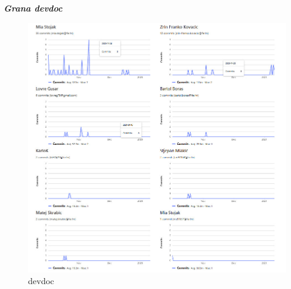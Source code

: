 		\begin{packed_item}
			\item \textbf{\textit{Grana devdoc}}\\
			
			\begin{figure}[h!]
				\centering
				\includegraphics[width=\linewidth]{./slike/devdoc.jpeg}
				\caption{devdoc}
			\end{figure}
			\eject
		\end{packed_item}
	
